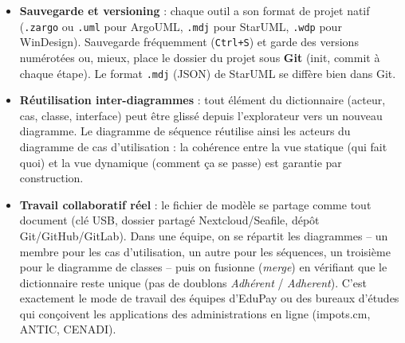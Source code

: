 \documentclass[11pt]{article}
\begin{document}
\begin{itemize}
\item \textbf{Sauvegarde et versioning} : chaque outil a son format de projet natif (\texttt{.zargo} ou \texttt{.uml} pour ArgoUML, \texttt{.mdj} pour StarUML, \texttt{.wdp} pour WinDesign). Sauvegarde fréquemment (\texttt{Ctrl+S}) et garde des versions numérotées ou, mieux, place le dossier du projet sous \textbf{Git} (init, commit à chaque étape). Le format \texttt{.mdj} (JSON) de StarUML se diffère bien dans Git.
\item \textbf{Réutilisation inter-diagrammes} : tout élément du dictionnaire (acteur, cas, classe, interface) peut être glissé depuis l'explorateur vers un nouveau diagramme. Le diagramme de séquence réutilise ainsi les acteurs du diagramme de cas d'utilisation : la cohérence entre la vue statique (qui fait quoi) et la vue dynamique (comment ça se passe) est garantie par construction.
\item \textbf{Travail collaboratif réel} : le fichier de modèle se partage comme tout document (clé USB, dossier partagé Nextcloud/Seafile, dépôt Git/GitHub/GitLab). Dans une équipe, on se répartit les diagrammes -- un membre pour les cas d'utilisation, un autre pour les séquences, un troisième pour le diagramme de classes -- puis on fusionne (\emph{merge}) en vérifiant que le dictionnaire reste unique (pas de doublons \emph{Adhérent} / \emph{Adherent}). C'est exactement le mode de travail des équipes d'EduPay ou des bureaux d'études qui conçoivent les applications des administrations en ligne (impots.cm, ANTIC, CENADI).
\end{itemize}
\end{document}
